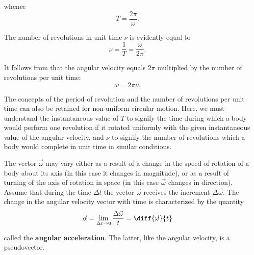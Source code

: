 \noindent
whence
\begin{equation}\label{eq:1_95}
T = \frac{2\pi}{\omega}.
\end{equation}

The number of revolutions in unit time $\nu$ is evidently equal to
\begin{equation}\label{eq:1_96}
\nu = \frac{1}{T} = \frac{\omega}{2\pi}.
\end{equation}

\noindent
It follows from  that the angular velocity equals $2\pi$ multiplied by the number of revolutions per unit time:
\begin{equation}\label{eq:1_97}
\omega = 2\pi\nu.
\end{equation}

The concepts of the period of revolution and the number of revolutions per unit time can also be retained for non-uniform circular motion. Here, we must understand the instantaneous value of $T$ to signify the time during which a body would perform one revolution if it rotated uniformly with the given instantaneous value of the angular velocity, and $\nu$ to signify the number of revolutions which a body would complete in unit time in similar conditions.

The vector $\vec{\omega}$ may vary either as a result of a change in the speed of rotation of a body about its axis (in this case it changes in magnitude), or as a result of turning of the axis of rotation in space (in this case $\vec{\omega}$ changes in direction). Assume that during the time $\Delta t$ the vector $\vec{\omega}$ receives the increment $\Delta\vec{\omega}$. The change in the angular velocity vector with time is characterized by the quantity
\begin{equation}\label{eq:1_98}
\vec{\alpha} = \lim_{\Delta t\to 0} \frac{\Delta\vec{\omega}}{t} = \diff{\vec{\omega}}{t}
\end{equation}

\noindent
called the \textbf{angular acceleration}. The latter, like the angular velocity, is a pseudovector.

